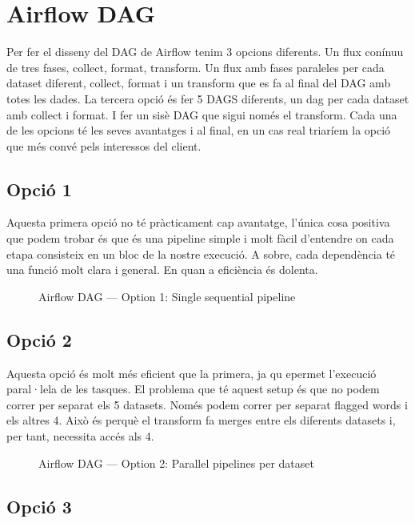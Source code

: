 \documentclass[12pt, a4paper]{article}
\begin{document}
\section{Airflow DAG}

Per fer el disseny del DAG de Airflow tenim 3 opcions diferents. Un flux conínuu de tres fases, collect, format, transform. Un flux amb fases paraleles per cada dataset diferent, collect, format i un transform que es fa al final del DAG amb totes les dades. La tercera opció és fer 5 DAGS diferents, un dag per cada dataset amb collect i format. I fer un sisè DAG que sigui només el transform. Cada una de les opcions té les seves avantatges i al final, en un cas real triaríem la opció que més convé pels interessos del client.

\subsection{Opció 1}
Aquesta primera opció no té pràcticament cap avantatge, l'única cosa positiva que podem trobar és que és una pipeline simple i molt fàcil d'entendre on cada etapa consisteix en un bloc de la nostre execució. A sobre, cada dependència té una funció molt clara i general. En quan a eficiència és dolenta.
\begin{figure}[H]
    \centering
    
    \caption{Airflow DAG — Option 1: Single sequential pipeline}
    \label{fig:dag1}
\end{figure}



\subsection{Opció 2}

Aquesta opció és molt més eficient que la primera, ja qu epermet l'execució paral·lela de les tasques. El problema que té aquest setup és que no podem correr per separat els 5 datasets. Només podem correr per separat flagged words i els altres 4. Això és perquè el transform fa merges entre els diferents datasets i, per tant, necessita accés als 4.

\begin{figure}[H]
    \centering
    
    \caption{Airflow DAG — Option 2: Parallel pipelines per dataset}
    \label{fig:dag2}
\end{figure}

\subsection{Opció 3}
\end{document}
